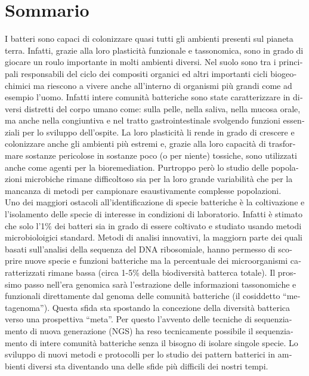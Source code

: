 \chapter{Sommario}
\begin{otherlanguage}{italian}

I batteri sono capaci di colonizzare quasi tutti gli ambienti presenti sul pianeta terra. Infatti, grazie alla loro plasticità funzionale e tassonomica, sono in grado di giocare un roulo importante in molti ambienti diversi. Nel suolo sono tra i principali responsabili del ciclo dei compositi organici ed altri importanti cicli biogeochimici ma riescono a vivere anche all'interno di organismi più grandi come ad esempio l'uomo. Infatti intere comunità batteriche sono state caratterizzare in diversi distretti del corpo umano come: sulla pelle, nella saliva, nella mucosa orale, ma anche nella congiuntiva e nel tratto gastrointestinale svolgendo funzioni essenziali per lo sviluppo dell'ospite. La loro plasticità li rende in grado di crescere e colonizzare anche gli ambienti più estremi e, grazie alla loro capacità di trasformare sostanze pericolose in sostanze poco (o per niente) tossiche, sono utilizzati anche come agenti per la bioremediation. Purtroppo però lo studio delle popolazioni microbiche rimane difficoltoso sia per la loro grande variabilità che per la mancanza di metodi per campionare esaustivamente complesse popolazioni.\\
Uno dei maggiori ostacoli all'identificazione di specie batteriche è la coltivazione e l'isolamento delle specie di interesse in condizioni di laboratorio. Infatti è stimato che solo l'1\% dei batteri sia in grado di essere coltivato e studiato usando metodi microbioloigici standard. Metodi di analisi innovativi, la maggiorn parte dei quali basati sull'analisi della sequenza del DNA ribosomiale, hanno permesso di scoprire nuove specie e funzioni batteriche ma la percentuale dei microorganismi caratterizzati rimane bassa (circa 1-5\% della biodiversità batterca totale). Il prossimo passo nell'era genomica sarà l'estrazione delle informazioni tassonomiche e funzionali direttamente dal genoma delle comunità batteriche (il cosiddetto ``metagenoma''). Questa sfida sta spostando la concezione della diversità batterica verso una prospettiva ``meta''. Per questo l'avvento delle tecniche di sequenziamento di nuova generazione (NGS) ha reso tecnicamente possibile il sequenziamento di intere comunità batteriche senza il bisogno di isolare singole specie. Lo sviluppo di nuovi metodi e protocolli per lo studio dei pattern batterici in ambienti diversi sta diventando una delle sfide più difficili dei nostri tempi.\\

\end{otherlanguage}